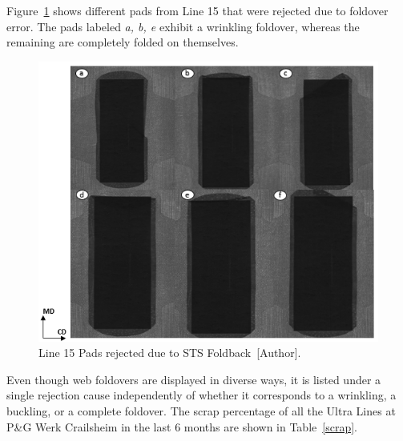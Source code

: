 Figure~\ref{foldback2} shows different pads from Line 15 that were rejected due to foldover error. The pads labeled \textit{a, b, e} exhibit a wrinkling foldover, whereas the remaining are completely folded on themselves.
\begin{figure}[H]
    \centering
    \includegraphics[width=0.75\linewidth]{FIGURES/foldback2.png}
    \caption{Line 15 Pads rejected due to STS Foldback~[Author].}
    \label{foldback2}
\end{figure}

Even though web foldovers are displayed in diverse ways, it is listed under a single rejection cause independently of whether it corresponds to a wrinkling, a buckling, or a complete foldover. The scrap percentage of all the Ultra Lines at P\&G Werk Crailsheim in the last 6 months are shown in Table~\ref{scrap}.

